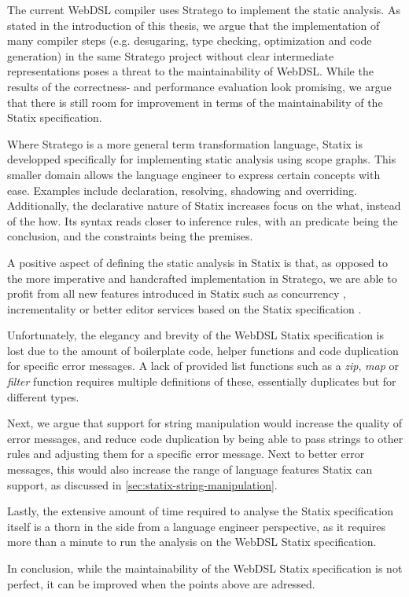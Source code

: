     The current WebDSL compiler uses Stratego to implement the static analysis. As stated in the introduction of this thesis, we argue that the implementation of many compiler steps (e.g. desugaring, type checking, optimization and code generation) in the same Stratego project without clear intermediate representations poses a threat to the maintainability of WebDSL. While the results of the correctness- and performance evaluation look promising, we argue that there is still room for improvement in terms of the maintainability of the Statix specification.
    
    Where Stratego is a more general term transformation language, Statix is developped specifically for implementing static analysis using scope graphs. This smaller domain allows the language engineer to express certain concepts with ease. Examples include declaration, resolving, shadowing and overriding. Additionally, the declarative nature of Statix increases focus on the what, instead of the how. Its syntax reads closer to inference rules, with an predicate being the conclusion, and the constraints being the premises.

    A positive aspect of defining the static analysis in Statix is that, as opposed to the more imperative and handcrafted implementation in Stratego, we are able to profit from all new features introduced in Statix such as concurrency \autocite{AntwerpenV21}, incrementality \autocite{ZwaanAV22} or better editor services based on the Statix specification \autocite{PelsmaekerAV19}.

    Unfortunately, the elegancy and brevity of the WebDSL Statix specification is lost due to the amount of boilerplate code, helper functions and code duplication for specific error messages. A lack of provided list functions such as a \textit{zip}, \textit{map} or \textit{filter} function requires multiple definitions of these, essentially duplicates but for different types.

    Next, we argue that support for string manipulation would increase the quality of error messages, and reduce code duplication by being able to pass strings to other rules and adjusting them for a specific error message. Next to better error messages, this would also increase the range of language features Statix can support, as discussed in \cref{sec:statix-string-manipulation}.

    Lastly, the extensive amount of time required to analyse the Statix specification itself is a thorn in the side from a language engineer perspective, as it requires more than a minute to run the analysis on the WebDSL Statix specification.

    In conclusion, while the maintainability of the WebDSL Statix specification is not perfect, it can be improved when the points above are adressed.
